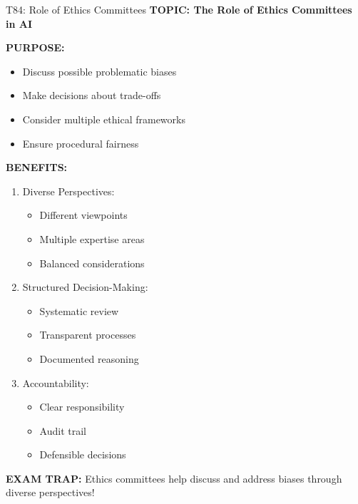 \documentclass[8pt]{beamer}
\begin{document}
	\begin{frame}{T84: Role of Ethics Committees}
		\fontsize{6.5}{7.5}\selectfont
		\textbf{TOPIC: The Role of Ethics Committees in AI}
		
		\vspace{0.1cm}
		\textbf{PURPOSE:}
		\begin{itemize}
			\item Discuss possible problematic biases
			\item Make decisions about trade-offs
			\item Consider multiple ethical frameworks
			\item Ensure procedural fairness
		\end{itemize}
		
		\vspace{0.1cm}
		\textbf{BENEFITS:}
		\begin{enumerate}
			\item \textcolor{myblue}{Diverse Perspectives:}
			\begin{itemize}
				\item Different viewpoints
				\item Multiple expertise areas
				\item Balanced considerations
			\end{itemize}
			\item \textcolor{myblue}{Structured Decision-Making:}
			\begin{itemize}
				\item Systematic review
				\item Transparent processes
				\item Documented reasoning
			\end{itemize}
			\item \textcolor{myblue}{Accountability:}
			\begin{itemize}
				\item Clear responsibility
				\item Audit trail
				\item Defensible decisions
			\end{itemize}
		\end{enumerate}
		
		\textcolor{myred}{\textbf{EXAM TRAP:}} Ethics committees help \textcolor{myblue}{discuss and address biases} through diverse perspectives!
	\end{frame}
	
\end{document}
